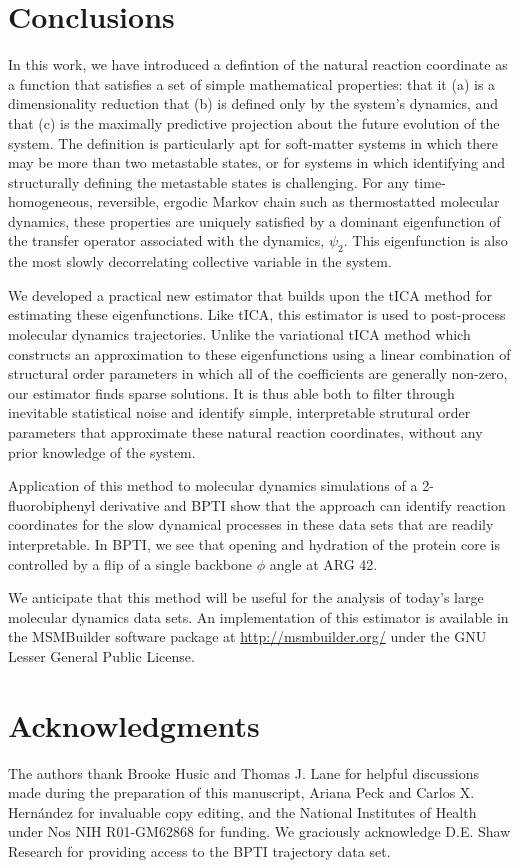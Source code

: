 \documentclass[aip, jcp, reprint, nolinenumbers, twocolumn, nobalancelastpage, nofootinbib]{revtex4-1}
\begin{document}
\section{Conclusions}

In this work, we have introduced a defintion of the natural reaction coordinate as a function that satisfies a set of simple mathematical properties: that it (a) is a dimensionality reduction that (b) is defined only by the system's dynamics, and that (c) is the maximally predictive projection about the future evolution of the system. The definition is particularly apt for soft-matter systems in which there may be more than two metastable states, or for systems in which identifying and structurally defining the metastable states is challenging. For any time-homogeneous, reversible, ergodic Markov chain such as thermostatted molecular dynamics, these properties are uniquely satisfied by a dominant eigenfunction of the transfer operator associated with the dynamics, $\psi_2$. This eigenfunction is also the most slowly decorrelating collective variable in the system.

We developed a practical new estimator that builds upon the tICA method for estimating these eigenfunctions. Like tICA, this estimator is used to post-process molecular dynamics trajectories. Unlike the variational tICA method which constructs an approximation to these eigenfunctions using a linear combination of structural order parameters in which all of the coefficients are generally non-zero, our estimator finds sparse solutions. It is thus able both to filter through inevitable statistical noise and identify simple, interpretable strutural order parameters that approximate these natural reaction coordinates, without any prior knowledge of the system.

Application of this method to molecular dynamics simulations of a 2-fluorobiphenyl derivative and BPTI show that the approach can identify reaction coordinates for the slow dynamical processes in these data sets that are readily interpretable. In BPTI, we see that opening and hydration of the protein core is controlled by a flip of a single backbone $\phi$ angle at ARG 42.

We anticipate that this method will be useful for the analysis of today's large molecular dynamics data sets. An implementation of this estimator is available in the MSMBuilder software package at \url{http://msmbuilder.org/} under the GNU Lesser General Public License.

\section*{Acknowledgments}
The authors thank Brooke Husic and Thomas J. Lane for helpful discussions made during the preparation of this manuscript, Ariana Peck and Carlos X. Hern\'{a}ndez for invaluable copy editing, and the National Institutes of Health under Nos NIH R01-GM62868 for funding. We graciously acknowledge D.E. Shaw Research for providing access to the BPTI trajectory data set.
\end{document}
